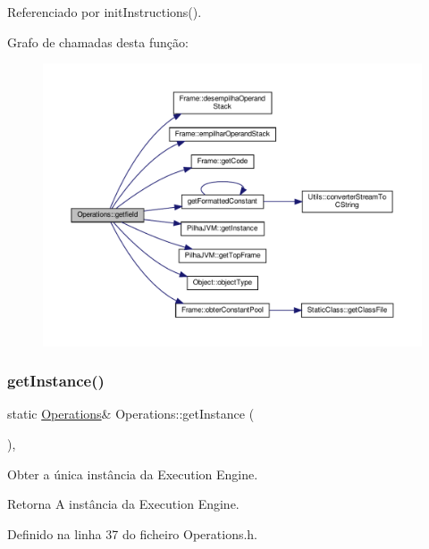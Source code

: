 Referenciado por init\+Instructions().

Grafo de chamadas desta função\+:
\nopagebreak
\begin{figure}[H]
\begin{center}
\leavevmode
\includegraphics[width=350pt]{classOperations_a0bb399fe0f64dc21699132c092560e19_cgraph}
\end{center}
\end{figure}
\mbox{\label{classOperations_afd99f64338fb7f1d1b813254f005bf9a}} 
\subsubsection{\texorpdfstring{get\+Instance()}{getInstance()}}
{\footnotesize\ttfamily static \hyperlink{classOperations}{Operations}\& Operations\+::get\+Instance (\begin{DoxyParamCaption}{ }\end{DoxyParamCaption})\hspace{0.3cm}{\ttfamily [inline]}, {\ttfamily [static]}}



Obter a única instância da Execution Engine. 

\begin{DoxyReturn}{Retorna}
A instância da Execution Engine. 
\end{DoxyReturn}


Definido na linha 37 do ficheiro Operations.\+h.



